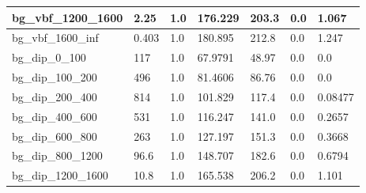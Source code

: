 \documentclass[a4paper, 10pt]{article}
\begin{document}
\begin{table}[H]
\begin{center}
\begin{tabular}{|m{23.0mm}|m{23.0mm}|m{18.0mm}|m{19.0mm}|m{19.0mm}|m{19.0mm}|m{19.0mm}|}
      \hline
      {\cellcolor{white}         bg\_vbf\_1200\_1600}& {\cellcolor{white}         2.25}& {\cellcolor{white}         1.0}& {\cellcolor{white}         176.229}& {\cellcolor{white}         203.3}& {\cellcolor{green}         0.0}& {\cellcolor{green}         1.067}\\
      \hline
      {\cellcolor{white}         bg\_vbf\_1600\_inf}& {\cellcolor{white}         0.403}& {\cellcolor{white}         1.0}& {\cellcolor{white}         180.895}& {\cellcolor{white}         212.8}& {\cellcolor{green}         0.0}& {\cellcolor{green}         1.247}\\
      \hline
      {\cellcolor{white}         bg\_dip\_0\_100}& {\cellcolor{white}         117}& {\cellcolor{white}         1.0}& {\cellcolor{white}         67.9791}& {\cellcolor{white}         48.97}& {\cellcolor{green}         0.0}& {\cellcolor{green}         0.0}\\
      \hline
      {\cellcolor{white}         bg\_dip\_100\_200}& {\cellcolor{white}         496}& {\cellcolor{white}         1.0}& {\cellcolor{white}         81.4606}& {\cellcolor{white}         86.76}& {\cellcolor{green}         0.0}& {\cellcolor{green}         0.0}\\
      \hline
      {\cellcolor{white}         bg\_dip\_200\_400}& {\cellcolor{white}         814}& {\cellcolor{white}         1.0}& {\cellcolor{white}         101.829}& {\cellcolor{white}         117.4}& {\cellcolor{green}         0.0}& {\cellcolor{green}         0.08477}\\
      \hline
      {\cellcolor{white}         bg\_dip\_400\_600}& {\cellcolor{white}         531}& {\cellcolor{white}         1.0}& {\cellcolor{white}         116.247}& {\cellcolor{white}         141.0}& {\cellcolor{green}         0.0}& {\cellcolor{green}         0.2657}\\
      \hline
      {\cellcolor{white}         bg\_dip\_600\_800}& {\cellcolor{white}         263}& {\cellcolor{white}         1.0}& {\cellcolor{white}         127.197}& {\cellcolor{white}         151.3}& {\cellcolor{green}         0.0}& {\cellcolor{green}         0.3668}\\
      \hline
      {\cellcolor{white}         bg\_dip\_800\_1200}& {\cellcolor{white}         96.6}& {\cellcolor{white}         1.0}& {\cellcolor{white}         148.707}& {\cellcolor{white}         182.6}& {\cellcolor{green}         0.0}& {\cellcolor{green}         0.6794}\\
      \hline
      {\cellcolor{white}         bg\_dip\_1200\_1600}& {\cellcolor{white}         10.8}& {\cellcolor{white}         1.0}& {\cellcolor{white}         165.538}& {\cellcolor{white}         206.2}& {\cellcolor{green}         0.0}& {\cellcolor{green}         1.101}\\

\end{tabular}
\end{center}
\end{table}
\end{document}
